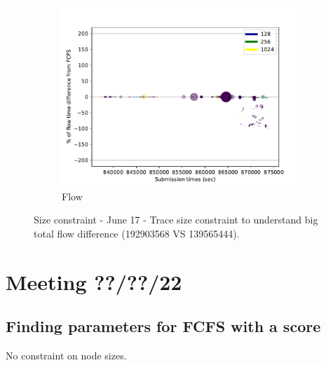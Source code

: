 \documentclass[a4paper]{article}
\begin{document}
\begin{figure}[H]
\begin{subfigure}[b]{0.4\linewidth}\centering\includegraphics[width=1\linewidth]{MBSS/plot/Flow_times_Fcfs_no_use_bigger_nodes_Fcfs_backfill_big_nodes_0_2022-02-08->2022-02-08_reduced_95_128_4_256_1_1024.pdf}\caption{Flow}\end{subfigure}
\caption{Size constraint - June 17 - Trace size constraint to understand big total flow difference (192903568 VS 139565444).}\end{figure}

\section{Meeting ??/??/22}

\subsection{Finding parameters for FCFS with a score}

No constraint on node sizes.
\end{document}
